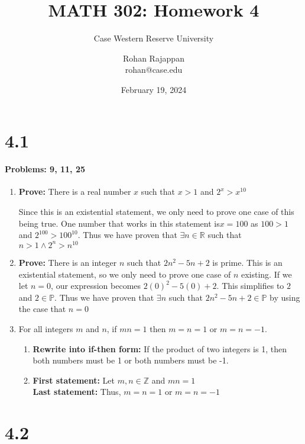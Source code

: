 \documentclass{article}
\title{MATH 302: Homework 4}
\subtitle{Case Western Reserve University}
\author{Rohan Rajappan \\rohan@case.edu}
\date{February 19, 2024}
\makeatletter
\newcommand\setItemnumber[1]{\setcounter{enum\romannumeral\@enumdepth}{\numexpr#1-1\relax}}
\makeatother
\begin{document}
\maketitle

\section{4.1}
 \paragraph{Problems: 9, 11, 25}
 \begin{enumerate}
     \setItemnumber{9}
     \item \textbf{Prove:} There is a real number $x$ such that $x>1$ and $2^x > x^{10}$

     Since this is an existential statement, we only need to prove one case of this being true. One number that works in this statement is$x=100$ as $100>1$ and $2^{100}>100^{10}$. Thus we have proven that $\exists n \in \mathbb{R}$ such that $n>1 \land 2^n>n^{10}$
     \setItemnumber{11}
     \item \textbf{Prove:} There is an integer $n$ such that $2n^2-5n+2$ is prime. This is an existential statement, so we only need to prove one case of $n$ existing. If we let $n=0$, our expression becomes $2(0)^2-5(0)+2$. This simplifies to $2$ and $2\in\mathbb{P}$. Thus we have proven that $\exists n$ such that $2n^2-5n+2 \in \mathbb{P}$ by using the case that $n=0$

     \setItemnumber{25}
     \item For all integers $m$ and $n$, if $mn=1$ then $m=n=1$ or $m=n=-1$.
     \begin{enumerate}
         \item \textbf{Rewrite into if-then form:} If the product of two integers is 1, then both numbers must be 1 or both numbers must be -1.
         \item \textbf{First statement:} Let $m, n \in\mathbb{Z}$ and $mn=1$ \\
         \textbf{Last statement:} Thus, $m=n=1$ or $m=n=-1$
     \end{enumerate}
 \end{enumerate}
 
  
\section{4.2}
\end{document}
